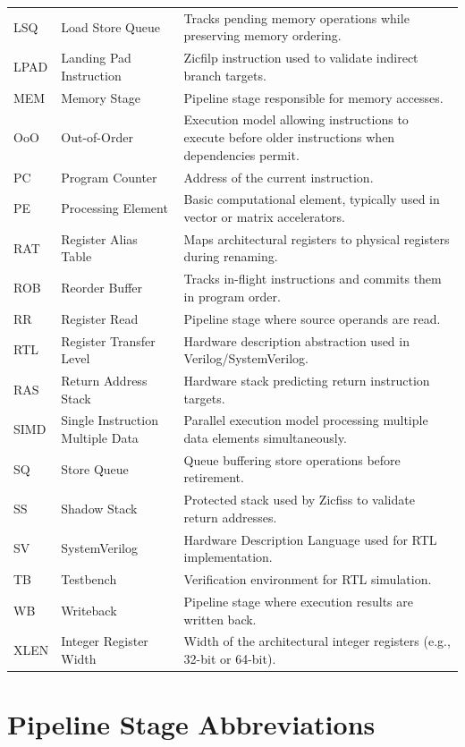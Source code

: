 \begin{longtable}{@{}p{}p{}p{}@{}}
LSQ & Load Store Queue & Tracks pending memory operations while preserving memory ordering. \\
LPAD & Landing Pad Instruction & Zicfilp instruction used to validate indirect branch targets. \\
MEM & Memory Stage & Pipeline stage responsible for memory accesses. \\
OoO & Out-of-Order & Execution model allowing instructions to execute before older instructions when dependencies permit. \\
PC & Program Counter & Address of the current instruction. \\
PE & Processing Element & Basic computational element, typically used in vector or matrix accelerators. \\
RAT & Register Alias Table & Maps architectural registers to physical registers during renaming. \\
ROB & Reorder Buffer & Tracks in-flight instructions and commits them in program order. \\
RR & Register Read & Pipeline stage where source operands are read. \\
RTL & Register Transfer Level & Hardware description abstraction used in Verilog/SystemVerilog. \\
RAS & Return Address Stack & Hardware stack predicting return instruction targets. \\
SIMD & Single Instruction Multiple Data & Parallel execution model processing multiple data elements simultaneously. \\
SQ & Store Queue & Queue buffering store operations before retirement. \\
SS & Shadow Stack & Protected stack used by Zicfiss to validate return addresses. \\
SV & SystemVerilog & Hardware Description Language used for RTL implementation. \\
TB & Testbench & Verification environment for RTL simulation. \\
WB & Writeback & Pipeline stage where execution results are written back. \\
XLEN & Integer Register Width & Width of the architectural integer registers (e.g., 32-bit or 64-bit). \\
\bottomrule
\end{longtable}
\endgroup

\chapter{Pipeline Stage Abbreviations}

